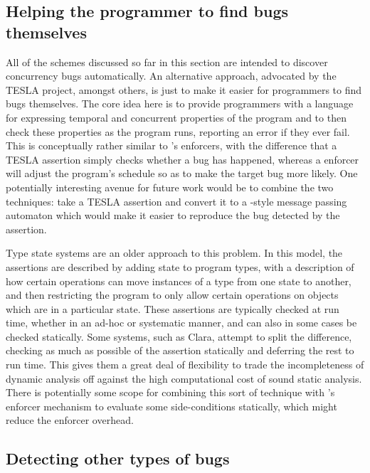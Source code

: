 \subsection{Helping the programmer to find bugs themselves}

All of the schemes discussed so far in this section are intended to
discover concurrency bugs automatically.  An alternative approach,
advocated by the TESLA project\needCite{}, amongst others, is just to
make it easier for programmers to find bugs themselves.  The core idea
here is to provide programmers with a language for expressing temporal
and concurrent properties of the program and to then check these
properties as the program runs, reporting an error if they ever fail.
This is conceptually rather similar to {\technique}'s enforcers, with
the difference that a TESLA assertion simply checks whether a bug has
happened, whereas a {\technique} enforcer will adjust the program's
schedule so as to make the target bug more likely.  One potentially
interesting avenue for future work would be to combine the two
techniques: take a TESLA assertion and convert it to a
{\implementation}-style message passing automaton which would make it
easier to reproduce the bug detected by the assertion.

Type state systems are an older approach to this problem\needCite{}.
In this model, the assertions are described by adding state to program
types, with a description of how certain operations can move instances
of a type from one state to another, and then restricting the program
to only allow certain operations on objects which are in a particular
state.  These assertions are typically checked at run time\needCite{},
whether in an ad-hoc\needCite{} or systematic\needCite{} manner, and
can also in some cases be checked statically\needCite{}.  Some
systems, such as Clara, attempt to split the
difference, checking as much as possible of the assertion statically
and deferring the rest to run time.  This gives them a great deal of
flexibility to trade the incompleteness of dynamic analysis off
against the high computational cost of sound static analysis.  There
is potentially some scope for combining this sort of technique with
{\technique}'s enforcer mechanism to evaluate some side-conditions
statically, which might reduce the enforcer overhead.

\subsection{Detecting other types of bugs}

